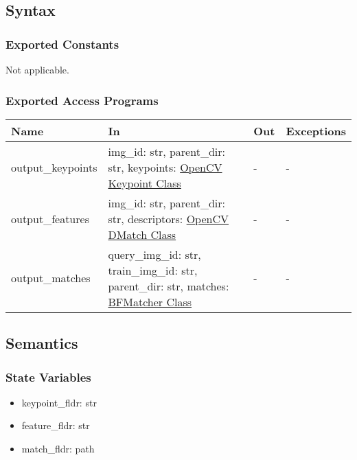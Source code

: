 \documentclass[12pt, titlepage]{article}
\begin{document}
\subsection{Syntax}

\subsubsection{Exported Constants}
Not applicable.
\subsubsection{Exported Access Programs}

\begin{center}
  \begin{tabular}{p{3cm} p{4cm} p{4cm} p{2cm}}
  \hline
  \textbf{Name} & \textbf{In} & \textbf{Out} & \textbf{Exceptions} \\
  \hline
  output\_keypoints 
  & img\_id: str, \newline
  parent\_dir: str, \newline
  keypoints: \href{https://docs.opencv.org/3.4/d2/d29/classcv_1_1KeyPoint.html}{OpenCV Keypoint Class}
  & -  
  & - \\
  \hline
  output\_features 
  & img\_id: str, \newline
  parent\_dir: str, \newline
  descriptors: \href{https://docs.opencv.org/3.4/d4/de0/classcv_1_1DMatch.html}{OpenCV DMatch Class}
  & - 
  & - \\
  \hline
  output\_matches 
  & query\_img\_id: str, \newline
  train\_img\_id: str, \newline
  parent\_dir: str, \newline
  matches: \href{https://docs.opencv.org/3.4/d3/da1/classcv_1_1BFMatcher.html}{BFMatcher Class}
  & - 
  & - \\
  \hline
  \end{tabular}
  \end{center}
  
  \subsection{Semantics}
  
  \subsubsection{State Variables}
  \begin{itemize}
    \item keypoint\_fldr: str
    \item feature\_fldr: str
    \item match\_fldr: path
  \end{itemize}
  
\end{document}
